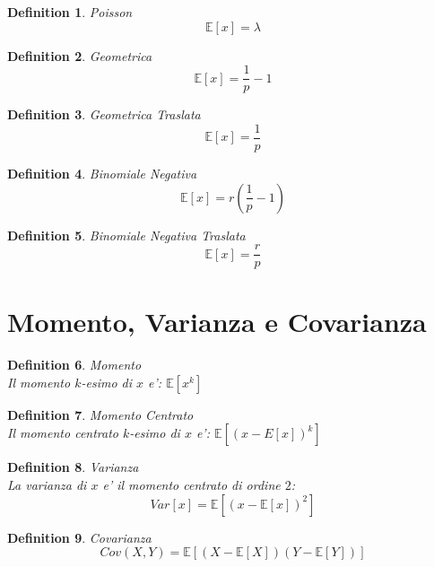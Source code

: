 \documentclass{article}
\newtheorem{definition}{Definition}[section]
\begin{document}
    \begin{definition} Poisson
        $$
        \mathbb E[x] = \lambda
        $$
    \end{definition}

    \begin{definition} Geometrica
        $$
        \mathbb E[x] = \frac 1 p -1
        $$
    \end{definition}

    \begin{definition} Geometrica Traslata
        $$
        \mathbb E[x] = \frac 1 p
        $$
    \end{definition}

    \begin{definition} Binomiale Negativa
        $$
        \mathbb E[x] = r (\frac 1 p - 1)
        $$
    \end{definition}

    \begin{definition} Binomiale Negativa Traslata
        $$
        \mathbb E[x] = \frac r p
        $$
    \end{definition}

    \newpage
    \section{Momento, Varianza e Covarianza}
    \begin{definition} Momento \\
        Il momento $k$-esimo di $x$ e': $\mathbb E[x^k]$ 
    \end{definition}

    \begin{definition} Momento Centrato \\
        Il momento centrato $k$-esimo di $x$ e': $\mathbb E[(x-E[x])^k]$ 
    \end{definition}

    \begin{definition} Varianza \\
        La varianza di $x$ e' il momento centrato di ordine $2$: 
        $$ Var[x] = \mathbb E[(x-\mathbb E[x])^2]$$
    \end{definition}

    \begin{definition} Covarianza \\
        $$
        Cov(X,Y) = \mathbb E[(X- \mathbb E[X])(Y - \mathbb E[Y])]
        $$
    \end{definition}
\end{document}
